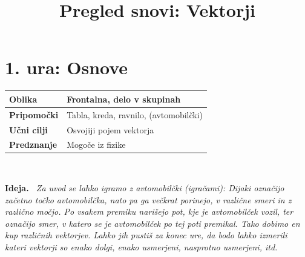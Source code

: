 \documentclass[a4paper,11pt]{article}
\newenvironment{ide}{%
  \par\medskip\noindent\textbf{Ideja.}\itshape\ }{\par\medskip}
\begin{document}
\title{Pregled snovi: Vektorji}
\author{}
\date{}
\maketitle

\tableofcontents
\newpage
\section{1. ura: Osnove}
\begin{tabularx}{\textwidth}{|>{\bfseries\RaggedRight}p{2.7cm}|X|}
\hline
Oblika & Frontalna, delo v skupinah \\ \hline
Pripomočki & Tabla, kreda, ravnilo, (avtomobilčki) \\ \hline
Učni cilji & Osvojiji pojem vektorja \\ \hline
Predznanje & Mogoče iz fizike \\ \hline

\end{tabularx}
\\

\begin{ide}
    Za uvod se lahko igramo z avtomobilčki (igračami): Dijaki označijo začetno točko avtomobilčka, nato pa ga večkrat porinejo, v različne smeri in z različno močjo. Po vsakem premiku narišejo pot, kje je avtomobilček vozil, ter označijo smer, v katero se je avtomobilček po tej poti premikal. Tako dobimo en kup različnih vektorjev. Lahko jih pustiš za konec ure, da bodo lahko izmerili kateri vektorji so enako dolgi, enako usmerjeni, nasprotno usmerjeni, itd.
\end{ide}
\end{document}
